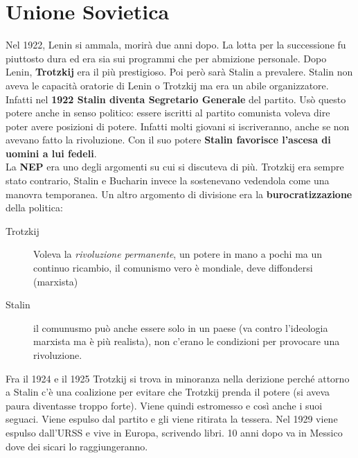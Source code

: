 
\section{Unione Sovietica}
Nel 1922, Lenin si ammala, morirà due anni dopo. La lotta per la successione fu piuttosto dura ed era
sia sui programmi che per abmizione personale. Dopo Lenin, \textbf{Trotzkij} era il più prestigioso.
Poi però sarà Stalin a prevalere. Stalin non aveva le capacità oratorie di Lenin o Trotzkij ma era un
abile organizzatore. Infatti nel \textbf{1922 Stalin diventa Segretario Generale} del partito. Usò
questo potere anche in senso politico: essere iscritti al partito comunista voleva dire poter
avere posizioni di potere. Infatti molti giovani si iscriveranno, anche se non avevano fatto la
rivoluzione. Con il suo potere \textbf{Stalin favorisce l'ascesa di uomini a lui fedeli}.\\
La \textbf{NEP} era uno degli argomenti su cui si discuteva di più. Trotzkij era sempre stato
contrario, Stalin e Bucharin invece la sostenevano vedendola come una manovra temporanea. Un altro
argomento di divisione era la \textbf{burocratizzazione} della politica:
\begin{description}
  \item[Trotzkij] Voleva la \textit{rivoluzione permanente}, un potere in mano a pochi ma un continuo
    ricambio, il comunismo vero è mondiale, deve diffondersi (marxista)
  \item[Stalin] il comunusmo può anche essere solo in un paese (va contro l'ideologia marxista ma è
    più realista), non c'erano le condizioni per provocare una rivoluzione.
\end{description}
Fra il 1924 e il 1925 Trotzkij si trova in minoranza nella derizione perché attorno a Stalin c'è una
coalizione per evitare che Trotzkij prenda il potere (si aveva paura diventasse troppo forte). Viene
quindi estromesso e così anche i suoi seguaci. Viene espulso dal partito e gli viene ritirata la
tessera. Nel 1929 viene espulso dall'URSS e vive in Europa, scrivendo libri. 10 anni dopo va in 
Messico dove dei sicari lo raggiungeranno.

